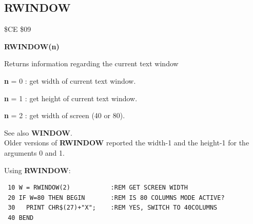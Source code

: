 \subsection{RWINDOW}
\begin{description}[leftmargin=2cm,style=nextline]
\item [Token:] \$CE \$09
\item [Format:] {\bf RWINDOW(n)}
\item [Usage:]  Returns information regarding the current text window

                {\bf n} = 0 : get width of current text window.

                {\bf n} = 1 : get height of current text window.

                {\bf n} = 2 : get width of screen (40 or 80).

\item [Remarks:] See also {\bf WINDOW}. \\
                 Older versions of {\bf RWINDOW} reported
                 the width-1 and the height-1 for the arguments 0 and 1.

\item [Example:] Using {\bf RWINDOW}:
\begin{tcolorbox}[colback=black,coltext=white]
\verbatimfont{\codefont}
\begin{verbatim}
 10 W = RWINDOW(2)           :REM GET SCREEN WIDTH
 20 IF W=80 THEN BEGIN       :REM IS 80 COLUMNS MODE ACTIVE?
 30   PRINT CHR$(27)+"X";    :REM YES, SWITCH TO 40COLUMNS
 40 BEND
\end{verbatim}
\end{tcolorbox}
\end{description}





\newpage
